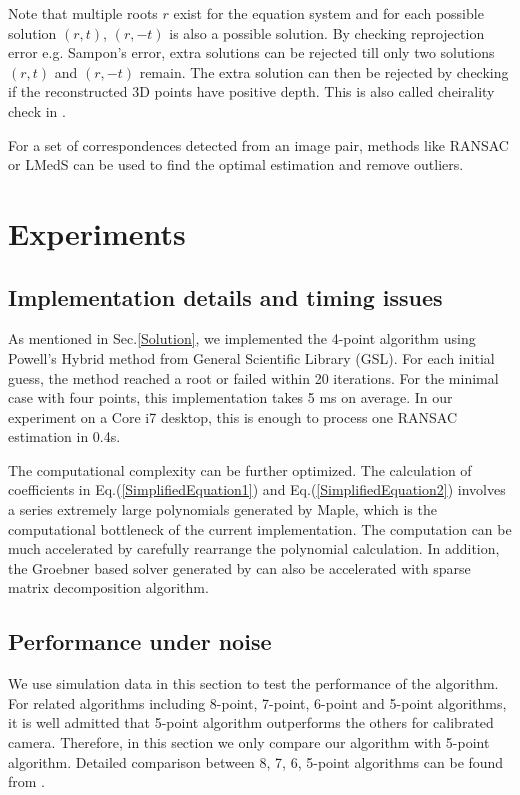\documentclass[letterpaper, 10 pt, conference]{ieeeconf}
\begin{document}
Note that multiple roots $r$ exist for the equation system and for each possible solution $(r, t)$, $(r, -t)$ is also a possible solution. By checking reprojection error e.g. Sampon's error, extra solutions can be rejected till only two solutions $(r, t)$ and $(r, -t)$ remain. The extra solution can then be rejected by checking if the reconstructed 3D points have positive depth. This is also called cheirality check in \cite{nister2004efficient}. 

For a set of correspondences detected from an image pair, methods like RANSAC or LMedS can be used to find the optimal estimation and remove outliers. 

\section{Experiments}
\label{Experiments}
\subsection{Implementation details and timing issues}
As mentioned in Sec.\ref{Solution}, we implemented the 4-point algorithm using Powell's Hybrid method from General Scientific Library (GSL). For each initial guess, the method reached a root or failed within 20 iterations. For the minimal case with four points, this implementation takes 5 ms on average. In our experiment on a Core i7 desktop, this is enough to process one RANSAC estimation in 0.4s. 

The computational complexity can be further optimized. The calculation of coefficients in Eq.(\ref{SimplifiedEquation1}) and Eq.(\ref{SimplifiedEquation2}) involves a series extremely large polynomials generated by Maple, which is the computational bottleneck of the current implementation. The computation can be much accelerated by carefully rearrange the polynomial calculation. In addition, the Groebner based solver generated by \cite{kukelova2008automatic} can also be accelerated with sparse matrix decomposition algorithm. 

\subsection{Performance under noise}
We use simulation data in this section to test the performance of the algorithm. For related algorithms including 8-point, 7-point, 6-point and 5-point algorithms, it is well admitted that 5-point algorithm outperforms the others for calibrated camera. Therefore, in this section we only compare our algorithm with 5-point algorithm. Detailed comparison between 8, 7, 6, 5-point algorithms can be found from \cite{nister2004efficient, stewenius2006recent}. 
\end{document}
